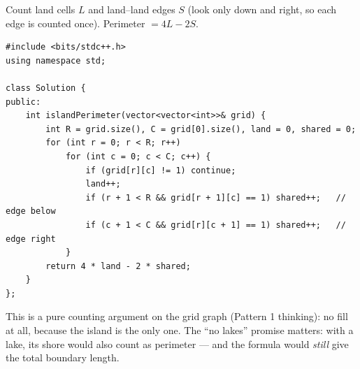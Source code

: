 \begin{solutionbox}
Count land cells $L$ and land--land edges $S$ (look only down and right, so each edge is counted once). Perimeter $= 4L - 2S$.
\begin{lstlisting}[style=cpp]
#include <bits/stdc++.h>
using namespace std;

class Solution {
public:
    int islandPerimeter(vector<vector<int>>& grid) {
        int R = grid.size(), C = grid[0].size(), land = 0, shared = 0;
        for (int r = 0; r < R; r++)
            for (int c = 0; c < C; c++) {
                if (grid[r][c] != 1) continue;
                land++;
                if (r + 1 < R && grid[r + 1][c] == 1) shared++;   // edge below
                if (c + 1 < C && grid[r][c + 1] == 1) shared++;   // edge right
            }
        return 4 * land - 2 * shared;
    }
};
\end{lstlisting}
\begin{center}
\end{center}
This is a pure counting argument on the grid graph (Pattern 1 thinking): no fill at all, because the island is the only one. The ``no lakes'' promise matters: with a lake, its shore would also count as perimeter --- and the formula would \emph{still} give the total boundary length.
\end{solutionbox}

